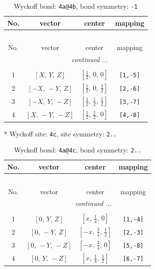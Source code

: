 \documentclass[fleqn,8pt]{jsarticle}
\begin{document}
\begin{longtable}{cccc}
\caption{Wyckoff bond: {\tt 4a@4b}, bond symmetry: {\tt -1}}
 \\
 \hline \hline
No. & vector & center & mapping \\ \hline \endfirsthead

\multicolumn{3}{l}{\tablename\ \thetable{}} \\
 \hline \hline
No. & vector & center & mapping \\ \hline \endhead

 \hline \hline
\multicolumn{3}{r}{\footnotesize\it continued ...} \\ \endfoot

 \hline \hline
\multicolumn{3}{r}{} \\ \endlastfoot

1 & $\left[ X,\, Y,\, Z \right]$ & $\left[ \frac{1}{2},\, 0,\, 0 \right]$ & {\tt [1,-5]} \\ \hline
2 & $\left[ - X,\, - Y,\, Z \right]$ & $\left[ \frac{1}{2},\, 0,\, \frac{1}{2} \right]$ & {\tt [2,-6]} \\ \hline
3 & $\left[ - X,\, Y,\, - Z \right]$ & $\left[ \frac{1}{2},\, \frac{1}{2},\, \frac{1}{2} \right]$ & {\tt [3,-7]} \\ \hline
4 & $\left[ X,\, - Y,\, - Z \right]$ & $\left[ \frac{1}{2},\, \frac{1}{2},\, 0 \right]$ & {\tt [4,-8]} \\
\end{longtable}
* Wyckoff site: {\tt 4c}, site symmetry: {\tt 2..}
\renewcommand{\arraystretch}{1.2}
\begin{longtable}{cccc}
\caption{Wyckoff bond: {\tt 4a@4c}, bond symmetry: {\tt 2..}}
 \\
 \hline \hline
No. & vector & center & mapping \\ \hline \endfirsthead

\multicolumn{3}{l}{\tablename\ \thetable{}} \\
 \hline \hline
No. & vector & center & mapping \\ \hline \endhead

 \hline \hline
\multicolumn{3}{r}{\footnotesize\it continued ...} \\ \endfoot

 \hline \hline
\multicolumn{3}{r}{} \\ \endlastfoot

1 & $\left[ 0,\, Y,\, Z \right]$ & $\left[ x,\, \frac{1}{4},\, 0 \right]$ & {\tt [1,-4]} \\ \hline
2 & $\left[ 0,\, - Y,\, Z \right]$ & $\left[ - x,\, \frac{3}{4},\, \frac{1}{2} \right]$ & {\tt [2,-3]} \\ \hline
3 & $\left[ 0,\, - Y,\, - Z \right]$ & $\left[ - x,\, \frac{3}{4},\, 0 \right]$ & {\tt [5,-8]} \\ \hline
4 & $\left[ 0,\, Y,\, - Z \right]$ & $\left[ x,\, \frac{1}{4},\, \frac{1}{2} \right]$ & {\tt [6,-7]} \\
\end{longtable}
\end{document}
